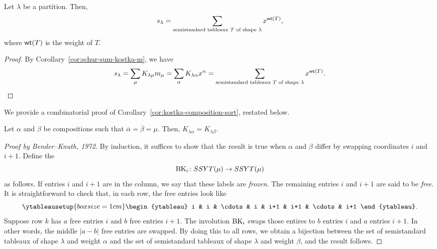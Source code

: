 \begin{corollary}
    Let \(\lambda\) be a partition.
    Then,
    \begin{equation}
        s_{\lambda} = \sum_{\text{semistandard tableaux } T \text{ of shape } \lambda} x^{\operatorname{\mathsf{wt}}(T)},
    \end{equation}
    where \(\operatorname{\mathsf{wt}}(T)\) is the weight of \(T\).
\end{corollary}

\begin{proof}
    By Corollary~\ref{cor:schur-sum-kostka-m}, we have
    \begin{equation}
        s_{\lambda} = \sum_{\mu} K_{\lambda \mu} m_{\mu}
        = \sum_{\alpha} K_{\lambda \alpha} x^{\alpha}
        = \sum_{\text{semistandard tableaux } T \text{ of shape } \lambda} x^{\operatorname{\mathsf{wt}}(T)}. \qedhere
    \end{equation}
\end{proof}

We provide a combinatorial proof of Corollary~\ref{cor:kostka-composition-sort}, restated below.
\begin{fact}
    Let \(\alpha\) and \(\beta\) be compositions such that \(\overline{\alpha} = \overline{\beta} = \mu\).  Then, \(K_{\lambda \alpha} = K_{\lambda \beta}\).
\end{fact}
\begin{proof}[Proof by Bender--Knuth, 1972]
    By induction, it suffices to show that the result is true when \(\alpha\) and \(\beta\) differ by swapping coordinates \(i\) and \(i+1\).
    Define the 
    \begin{equation}
        \operatorname{BK}_{i} \colon SSYT(\mu) \to SSYT(\mu)
    \end{equation}
    as follows.
    If entries \(i\) and \(i+1\) are in the column, we say that these labels are \emph{frozen}.
    The remaining entries \(i\) and \(i+1\) are said to be \emph{free}.
    It is straightforward to check that, in each row, the free entries look like
    \begin{equation}
        \ytableausetup{boxsize=1cm}
        \begin{ytableau}
            i & i & \cdots & i & i+1 & i+1 & \cdots & i+1
        \end{ytableau}.
    \end{equation}
    Suppose row \(k\) has \(a\) free entries \(i\) and \(b\) free entries \(i+1\).
    The involution \(\operatorname{BK}_{i}\) swaps those entires to \(b\) entries \(i\) and \(a\) entries \(i+1\).
    In other words, the middle \(|a-b|\) free entries are swapped.
    By doing this to all rows, we obtain a bijection between the set of semistandard tableaux of shape \(\lambda\) and weight \(\alpha\) and the set of semistandard tableaux of shape \(\lambda\) and weight \(\beta\), and the result follows.
\end{proof}

